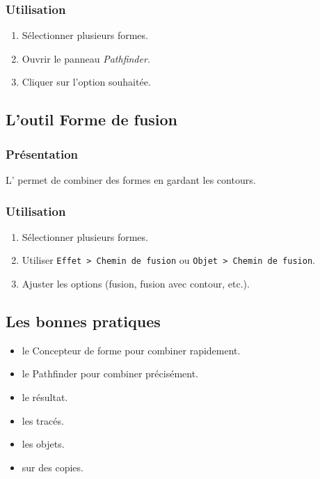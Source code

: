\subsubsection{Utilisation}

\begin{enumerate}
    \item Sélectionner plusieurs formes.
    \item Ouvrir le panneau \emph{Pathfinder}.
    \item Cliquer sur l'option souhaitée.
\end{enumerate}

\subsection{L'outil Forme de fusion}

\subsubsection{Présentation}

L' permet de combiner des formes en gardant les contours.

\subsubsection{Utilisation}

\begin{enumerate}
    \item Sélectionner plusieurs formes.
    \item Utiliser \texttt{Effet > Chemin de fusion} ou \texttt{Objet > Chemin de fusion}.
    \item Ajuster les options (fusion, fusion avec contour, etc.).
\end{enumerate}

\subsection{Les bonnes pratiques}

\begin{itemize}
    \item {} le Concepteur de forme pour combiner rapidement.
    \item {} le Pathfinder pour combiner précisément.
    \item {} le résultat.
    \item {} les tracés.
    \item {} les objets.
    \item {} sur des copies.
\end{itemize}

